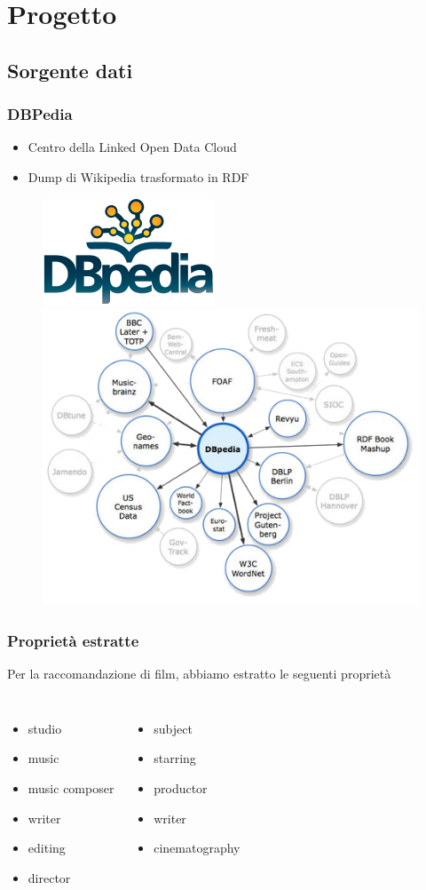 \documentclass{beamer}
\begin{document}

\section{Progetto}

\subsection{Sorgente dati}

\begin{frame}
\frametitle{DBPedia}
\begin{itemize}
\item Centro della Linked Open Data Cloud
\item Dump di Wikipedia trasformato in RDF
\end{itemize}
\begin{figure}
\includegraphics[width=.30\textwidth]{figure/dbpedia_logo}
\includegraphics[width=.60\textwidth]{figure/AboutDBPedia}
\end{figure}
\end{frame}

\begin{frame}
\frametitle{Proprietà estratte}
Per la raccomandazione di film, abbiamo estratto le seguenti proprietà
\begin{columns}
\column[t]{5cm}
\begin{itemize}
\item studio
\item music
\item music composer
\item writer
\item editing
\item director
\end{itemize}
\column[t]{5cm}
\begin{itemize}
\item subject
\item starring
\item productor
\item writer
\item cinematography
\end{itemize}
\end{columns}
\end{frame}
\end{document}
